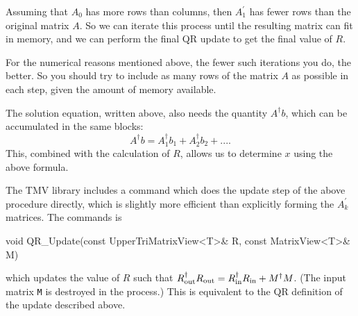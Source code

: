 \documentclass[twoside,letterpaper,11pt]{article}
\renewcommand{\tt}[1]{{\lstinline {#1}}}
\begin{document}
Assuming that $A_0$ has more rows than columns, 
then $A_1^\prime$ has fewer rows than
the original matrix $A$.  So we can iterate this process until the 
resulting matrix can fit in memory, and we can perform the final QR update
to get the final value of $R$.

For the numerical reasons mentioned above, 
the fewer such iterations you do, the better.  So you should try to include as many
rows of the matrix $A$ as possible in each step, given the amount of memory
available.

The solution equation, written above, also needs the quantity $A^\dagger b$, which
can be accumulated in the same blocks:
\begin{equation*}
A^\dagger b = A_1^\dagger b_1 + A_2^\dagger b_2 + ....
\end{equation*}
This, combined with the calculation of $R$, allows us to determine $x$ using the above formula.

The TMV library includes a command which does the update step of the above procedure
directly, which is slightly more efficient than explicitly forming the $A_k^\prime$ matrices.
The commands is
\begin{tmvcode}
void QR_Update(const UpperTriMatrixView<T>& R, const MatrixView<T>& M)
\end{tmvcode}
which updates the value of $R$ such that $R_{\rm out}^\dagger R_{\rm out} =
R_{\rm in}^\dagger R_{\rm in} + M^\dagger M$.
(The input matrix \tt{M} is destroyed in the process.)  This is equivalent to the QR
definition of the update described above.
\end{document}
